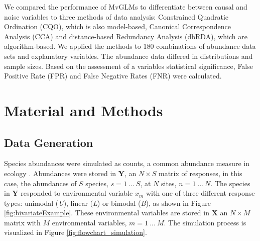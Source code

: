 \documentclass[a4paper,11pt]{article}
\begin{document}
	
	We compared the performance of MvGLMs to differentiate between causal and noise variables to three methods of data analysis: 
	Constrained Quadratic Ordination (CQO), which is also model-based, Canonical Correspondence Analysis (CCA) and distance-based Redundancy Analysis (dbRDA), which are algorithm-based.
	We applied the methods to 180 combinations of abundance data sets and explanatory variables.
	The abundance data differed in distributions and sample sizes. 
    Based on the assessment of a variables statistical significance, False Positive Rate (FPR) and False Negative Rates (FNR) were calculated. 
\section{Material and Methods}


	\subsection{Data Generation}
		Species abundances were simulated as counts, a common abundance measure in ecology \citep{Warton2008}. 
		Abundances were stored in $\mathbf{Y}$, an $N \times S$ matrix of responses, in this case, the abundances of $S$ species, $ s= 1\ ...\ S$, at $N$ sites, $ n = 1\ ...\ N$.
		The species in $\mathbf{Y}$ responded to  environmental variable $x_m$ with one of three different response types: unimodal (\textit{U}), linear (\textit{L}) or bimodal (\textit{B}), as shown in Figure \ref{fig:bivariateExample}.
		These environmental variables are stored in $\mathbf{X}$ an $N \times M$ matrix with $M$ environmental variables, $m = 1\ ... \ M$. 
	    The simulation process is visualized in Figure \ref{fig:flowchart_simulation}. 
\end{document}
